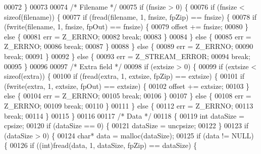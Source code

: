 \begin{DoxyCode}
00072         \}
00073 
00074         \textcolor{comment}{/* Filename */}
00075         \textcolor{keywordflow}{if} (fnsize > 0) \{
00076           \textcolor{keywordflow}{if} (fnsize < \textcolor{keyword}{sizeof}(filename)) \{
00077             \textcolor{keywordflow}{if} (fread(filename, 1, fnsize, fpZip) == fnsize) \{
00078                 \textcolor{keywordflow}{if} (fwrite(filename, 1, fnsize, fpOut) == fnsize) \{
00079                 offset += fnsize;
00080               \} \textcolor{keywordflow}{else} \{
00081                 err = Z\_ERRNO;
00082                 \textcolor{keywordflow}{break};
00083               \}
00084             \} \textcolor{keywordflow}{else} \{
00085               err = Z\_ERRNO;
00086               \textcolor{keywordflow}{break};
00087             \}
00088           \} \textcolor{keywordflow}{else} \{
00089             err = Z\_ERRNO;
00090             \textcolor{keywordflow}{break};
00091           \}
00092         \} \textcolor{keywordflow}{else} \{
00093           err = Z\_STREAM\_ERROR;
00094           \textcolor{keywordflow}{break};
00095         \}
00096 
00097         \textcolor{comment}{/* Extra field */}
00098         \textcolor{keywordflow}{if} (extsize > 0) \{
00099           \textcolor{keywordflow}{if} (extsize < \textcolor{keyword}{sizeof}(extra)) \{
00100             \textcolor{keywordflow}{if} (fread(extra, 1, extsize, fpZip) == extsize) \{
00101               \textcolor{keywordflow}{if} (fwrite(extra, 1, extsize, fpOut) == extsize) \{
00102                 offset += extsize;
00103                 \} \textcolor{keywordflow}{else} \{
00104                 err = Z\_ERRNO;
00105                 \textcolor{keywordflow}{break};
00106               \}
00107             \} \textcolor{keywordflow}{else} \{
00108               err = Z\_ERRNO;
00109               \textcolor{keywordflow}{break};
00110             \}
00111           \} \textcolor{keywordflow}{else} \{
00112             err = Z\_ERRNO;
00113             \textcolor{keywordflow}{break};
00114           \}
00115         \}
00116 
00117         \textcolor{comment}{/* Data */}
00118         \{
00119           \textcolor{keywordtype}{int} dataSize = cpsize;
00120           \textcolor{keywordflow}{if} (dataSize == 0) \{
00121             dataSize = uncpsize;
00122           \}
00123           \textcolor{keywordflow}{if} (dataSize > 0) \{
00124             \textcolor{keywordtype}{char}* data = malloc(dataSize);
00125             \textcolor{keywordflow}{if} (data != NULL) \{
00126               \textcolor{keywordflow}{if} ((\textcolor{keywordtype}{int})fread(data, 1, dataSize, fpZip) == dataSize) \{

\end{DoxyCode}
